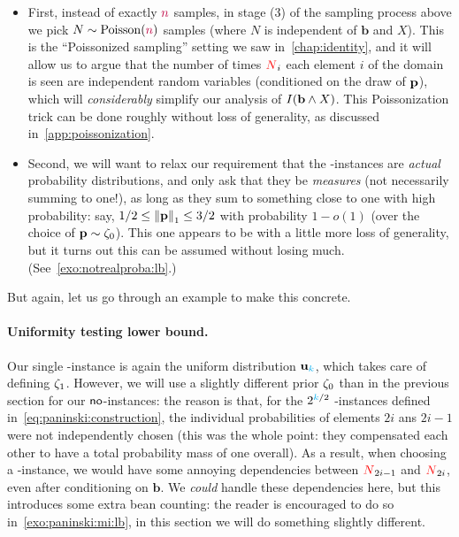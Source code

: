 \begin{itemize}
	\item First, instead of exactly ${\textcolor{purple}{n}}$ samples, in stage (3) of the sampling process above we pick $N\sim\poisson{\ns}$ samples (where $N$ is independent of $\mathbf{b}$ and $X$). This is the ``Poissonized sampling'' setting we saw in~\cref{chap:identity}, and it will allow us to argue that the number of times $\textcolor{red}{N}_{i}$ each element $i$ of the domain is seen are independent random variables (conditioned on the draw of $\mathbf{p}$), which will \emph{considerably} simplify our analysis of $\mutualinfo{\mathbf{b}}{X}$. This Poissonization trick can be done roughly without loss of generality, as discussed in~\cref{app:poissonization}.
	\item Second, we will want to relax our requirement that the \no-instances are \emph{actual} probability distributions, and only ask that they be \emph{measures} (not necessarily summing to one!), as long as they sum to something close to one with high probability: say, $1/2\leq \normone{\p} \leq 3/2$ with probability $1-o(1)$ (over the choice of $\mathbf{p}\sim\zeta_0$). This one appears to be with a little more loss of generality, but it turns out this can be assumed without losing much. (See~\cref{exo:notrealproba:lb}.) 
\end{itemize}
\noindent But again, let us go through an example to make this concrete.

\paragraph{Uniformity testing lower bound.} Our single \yes-instance is again the uniform distribution $\mathbf{u}_{\textcolor{cyan}{k}}$, which takes care of defining $\zeta_1$. However, we will use a slightly different prior $\zeta_0$ than in the previous section for our ${\sf{}no}$-instances: the reason is that, for the $2^{{\textcolor{cyan}{k}}/2}$ \no-instances defined in~\cref{eq:paninski:construction}, the individual probabilities of elements $2i$ ans $2i-1$ were not independently chosen (this was the whole point: they compensated each other to have a total probability mass of one overall). As a result, when choosing a \no-instance, we would have some annoying dependencies between $\textcolor{red}{N}_{2i-1}$ and $\textcolor{red}{N}_{2i}$, even after conditioning on $\textbf{b}$.  We \emph{could} handle these dependencies here, but this introduces some extra bean counting: the reader is encouraged to do so in~\cref{exo:paninski:mi:lb}, in this section we will do something slightly different.

